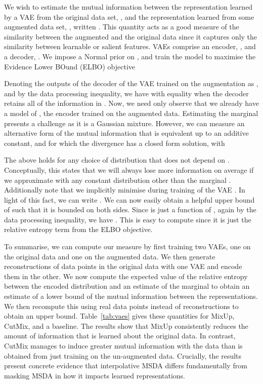\documentclass[journal]{IEEEtran}
\newcommand{\mixup}{MixUp\xspace}
\newcommand{\cutmix}{CutMix\xspace}
\begin{document}
We wish to estimate the mutual information between the representation learned by a VAE from the original data set, , and the representation learned from some augmented data set, , written .
This quantity acts as a good measure of the similarity between the augmented and the original data since it captures only the similarity between learnable or salient features. 
VAEs comprise an encoder, , and a decoder, . We impose a Normal prior on , and train the model to maximise the Evidence Lower BOund (ELBO) objective

Denoting the outputs of the decoder of the VAE trained on the augmentation as , and by the data processing inequality, we have  with equality when the decoder retains all of the information in .
Now, we need only observe that we already have a model of , the encoder trained on the augmented data.
Estimating the marginal  presents a challenge as it is a Gaussian mixture. However, we can measure an alternative form of the mutual information that is equivalent up to an additive constant, and for which the divergence has a closed form solution, with

The above holds for any choice of distribution that does not depend on . Conceptually, this states that we will always lose more information on average if we approximate  with any constant distribution other than the marginal .
Additionally note that we implicitly minimise  during training of the VAE \citep{hoffman2016elbo}.
In light of this fact, we can write . We can now easily obtain a helpful upper bound of  such that it is bounded on both sides. Since  is just a function of , again by the data processing inequality, we have . This is easy to compute since it is just the relative entropy term from the ELBO objective.

To summarise, we can compute our measure by first training two VAEs, one on the original data and one on the augmented data. We then generate reconstructions of data points in the original data with one VAE and encode them in the other. We now compute the expected value of the relative entropy between the encoded distribution and an estimate of the marginal to obtain an estimate of a lower bound of the mutual information between the representations. We then recompute this using real data points instead of reconstructions to obtain an upper bound.
Table~\ref{tab:vaes} gives these quantities for \mixup, \cutmix, and a baseline. The results show that \mixup consistently reduces the amount of information that is learned about the original data. In contrast, \cutmix manages to induce greater mutual information with the data than is obtained from just training on the un-augmented data.
Crucially, the results present concrete evidence that interpolative MSDA differs fundamentally from masking MSDA in how it impacts learned representations.
\end{document}
